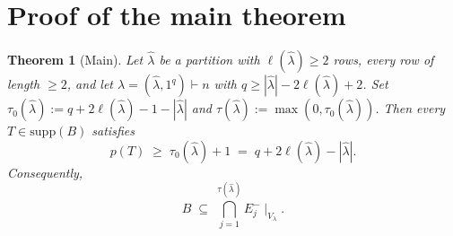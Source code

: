 \documentclass[11pt]{article}
\newtheorem{theorem}{Theorem}
\theoremstyle{definition}
\newcommand{\Vlam}{V_\lambda}
\newcommand{\hatl}{\widehat\lambda}
\newcommand{\supp}{\mathrm{supp}}
\newcommand{\elh}{\ell(\hatl)}
\begin{document}
\section{Proof of the main theorem}\label{sec:main-proof}

\begin{theorem}[Main]\label{thm:main}
Let $\hatl$ be a partition with $\elh \ge 2$ rows, every row of
length $\ge 2$, and let $\lambda = (\hatl, 1^q) \vdash n$ with
$q \ge |\hatl| - 2\elh + 2$.  Set $\tau_0(\hatl) := q + 2\elh - 1 -
|\hatl|$ and $\tau(\hatl) := \max(0, \tau_0(\hatl))$.  Then every
$T \in \supp(B)$ satisfies
\begin{equation}\label{eq:main-prefix}
   p(T) \;\ge\; \tau_0(\hatl) + 1
   \;=\; q + 2\elh - |\hatl|.
\end{equation}
Consequently,
\[
   B \;\subseteq\; \bigcap_{j=1}^{\tau(\hatl)} E_j^-\!\mid_{\Vlam}.
\]
\end{theorem}
\end{document}
